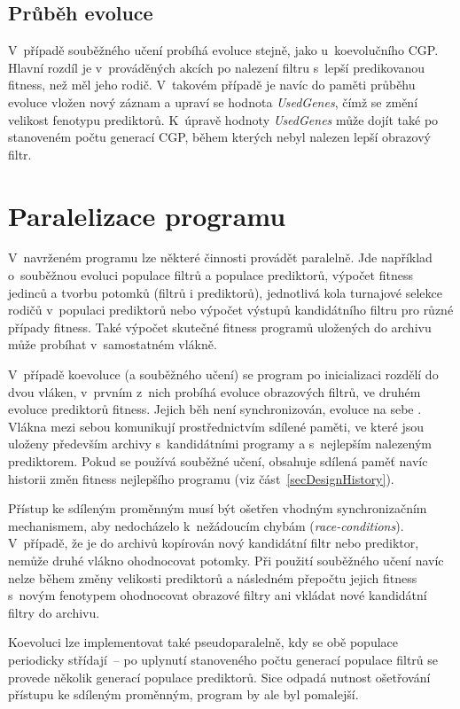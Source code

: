 \subsection{Průběh evoluce}

V~případě souběžného učení probíhá evoluce stejně, jako u~koevolučního CGP. Hlavní rozdíl je v~prováděných akcích po nalezení filtru s~lepší predikovanou fitness, než měl jeho rodič. V~takovém případě je navíc do paměti průběhu evoluce vložen nový záznam a upraví se hodnota \emph{UsedGenes}, čímž se změní velikost fenotypu prediktorů. K~úpravě hodnoty \emph{UsedGenes} může dojít také po stanoveném počtu generací CGP, během kterých nebyl nalezen lepší obrazový filtr.

\section{Paralelizace programu}
\label{secDesignParallel}

V~navrženém programu lze některé činnosti provádět paralelně. Jde například o~souběžnou evoluci populace filtrů a populace prediktorů, výpočet fitness jedinců a tvorbu potomků (filtrů i prediktorů), jednotlivá kola turnajové selekce rodičů v~populaci prediktorů nebo výpočet výstupů kandidátního filtru pro různé případy fitness. Také výpočet skutečné fitness programů uložených do archivu může probíhat v~samostatném vlákně.

V~případě koevoluce (a souběžného učení) se program po inicializaci rozdělí do dvou vláken, v~prvním z~nich probíhá evoluce obrazových filtrů, ve druhém evoluce prediktorů fitness. Jejich běh není synchronizován, evoluce na sebe . Vlákna mezi sebou komunikují prostřednictvím sdílené paměti, ve které jsou uloženy především archivy s~kandidátními programy a s~nejlepším nalezeným prediktorem. Pokud se používá souběžné učení, obsahuje sdílená paměť navíc historii změn fitness nejlepšího programu (viz část~\ref{secDesignHistory}).

Přístup ke sdíleným proměnným musí být ošetřen vhodným synchronizačním mechanismem, aby nedocházelo k~nežádoucím chybám (\emph{race-conditions}). V~případě, že je do archivů kopírován nový kandidátní filtr nebo prediktor, nemůže druhé vlákno ohodnocovat potomky. Při použití souběžného učení navíc nelze během změny velikosti prediktorů a následném přepočtu jejich fitness s~novým fenotypem ohodnocovat obrazové filtry ani vkládat nové kandidátní filtry do archivu.

Koevoluci lze implementovat také pseudoparalelně, kdy se obě populace periodicky střídají~-- po uplynutí stanoveného počtu generací populace filtrů se provede několik generací populace prediktorů. Sice odpadá nutnost ošetřování přístupu ke sdíleným proměnným, program by ale byl pomalejší.

